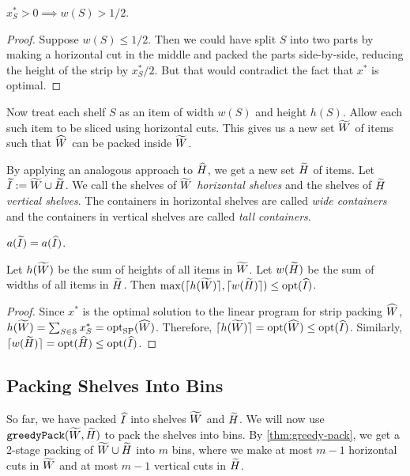 \begin{lemma}
$x_S^* > 0 \implies w(S) > 1/2$.
\end{lemma}
\begin{proof}
Suppose $w(S) \le 1/2$. Then we could have split $S$ into two parts by making a horizontal cut
in the middle and packed the parts side-by-side, reducing the height of the strip by $x^*_S/2$.
But that would contradict the fact that $x^*$ is optimal.
\end{proof}

Now treat each shelf $S$ as an item of width $w(S)$ and height $h(S)$.
Allow each such item to be sliced using horizontal cuts.
This gives us a new set $\widetilde{W}$ of items such that $\widehat{W}$ can be packed inside $\widetilde{W}$.

By applying an analogous approach to $\widehat{H}$, we get a new set $\widetilde{H}$ of items.
Let $\widetilde{I} := \widetilde{W} \cup \widetilde{H}$.
We call the shelves of $\widetilde{W}$ \emph{horizontal shelves} and the shelves of $\widetilde{H}$
\emph{vertical shelves}. The containers in horizontal shelves are called \emph{wide containers}
and the containers in vertical shelves are called \emph{tall containers}.

\begin{claim}
\label{thm:area-eq}
$a(\widetilde{I}) = a(\widehat{I})$.
\end{claim}
\begin{lemma}
\label{thm:hw-opt}
Let $h(\widetilde{W})$ be the sum of heights of all items in $\widetilde{W}$.
Let $w(\widetilde{H})$ be the sum of widths of all items in $\widetilde{H}$.
Then $\max(\lceil h(\widetilde{W}) \rceil, \lceil w(\widetilde{H}) \rceil) \le \operatorname{opt}(\widehat{I})$.
\end{lemma}
\begin{proof}
Since $x^*$ is the optimal solution to the linear program for strip packing $\widehat{W}$,
$h(\widetilde{W}) = \sum_{S \in \mathcal{S}} x^*_S = \operatorname{opt}_{\mathrm{SP}}(\widehat{W})$.
Therefore, $\lceil h(\widetilde{W}) \rceil = \operatorname{opt}(\widehat{W}) \le \operatorname{opt}(\widehat{I})$.
Similarly, $\lceil w(\widetilde{H}) \rceil = \operatorname{opt}(\widehat{H}) \le \operatorname{opt}(\widehat{I})$.
\end{proof}

\subsection{Packing Shelves Into Bins}
\label{sec:bp-algo:pack-shelves-into-bins}

So far, we have packed $\widehat{I}$ into shelves $\widetilde{W}$ and $\widetilde{H}$.
We will now use $\operatorname{\mathtt{greedyPack}}(\widetilde{W}, \widetilde{H})$ to pack the shelves into bins.
By \cref{thm:greedy-pack}, we get a 2-stage packing of $\widetilde{W} \cup \widetilde{H}$
into $m$ bins, where we make at most $m-1$ horizontal cuts in $\widetilde{W}$
and at most $m-1$ vertical cuts in $\widetilde{H}$.

